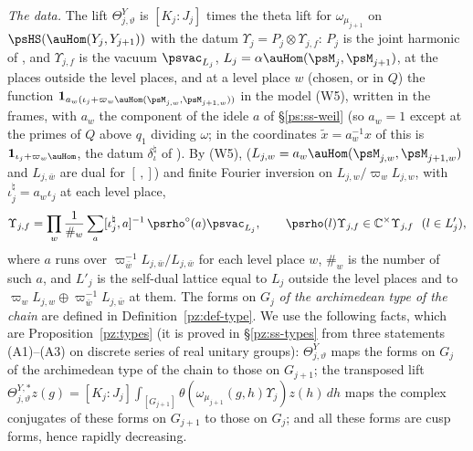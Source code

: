 \documentclass[10pt]{amsart}
\theoremstyle{definition}
\theoremstyle{remark}
\newcommand{\C}{\mathbb C}
\begin{document}
\emph{The data.} The lift $\Theta^Y_{j,\vartheta}$ is $[K_j:J_j]$ times the theta lift for
$\omega_{\mu_{j+1}}$ on $\psHS(\auHom(Y_j,Y_{j+1}))$ with the datum $\Upsilon_j=P_j\otimes
\Upsilon_{j,f}$: $P_j$ is the joint harmonic of {\cite[\S14.3]{P46}}, and $\Upsilon_{j,f}$ is the
vacuum $\psvac_{L_j}$, $L_j=\alpha\auHom(\psM_j,\psM_{j+1})$, at the places outside the level
places, and at a level place $w$ (chosen, or in $Q$) the function
$\mathbf 1_{a_w(\iota_j+\varpi_w\auHom(\psM_{j,w},\psM_{j+1,w}))}$ in the model (W5), written in the
frames, with $a_w$ the component of the idele $a$ of \S\ref{ps:ss-weil} (so $a_w=1$ except at the
primes of $Q$ above $q_1$ dividing $\omega$; in the coordinates $\tilde x=a_w^{-1}x$ of
{\cite[Lemma~6.32]{P53}} this is $\mathbf 1_{\iota_j+\varpi_w\auHom}$, the datum $\delta_\iota^\natural$ of
{\cite[Definition~6.31]{P53}}). By (W5), {\cite[Lemma~6.30]{P53}} ($L_{j,w}=a_w\auHom(\psM_{j,w},\psM_{j+1,w})$ and
$L_{j,\bar w}$ are dual for $[\,,]$) and finite Fourier inversion on $L_{j,w}/\varpi_wL_{j,w}$, with
$\iota^\natural_j=a_w\iota_j$ at each level place,
\begin{equation}\label{ps:eq-upsilon}
\Upsilon_{j,f}=\prod_w\frac1{\#_w}\sum_{a}[\iota^\natural_j,a]^{-1}\,\psrho^\circ(a)\psvac_{L_j},\qquad
\psrho(l)\Upsilon_{j,f}\in\C^\times\Upsilon_{j,f}\ \ (l\in L'_j),
\end{equation}
where $a$ runs over $\varpi_{\bar w}^{-1}L_{j,\bar w}/L_{j,\bar w}$ for each level place $w$,
$\#_w$ is the number of such $a$, and $L'_j$ is the self-dual lattice equal to $L_j$ outside the
level places and to $\varpi_wL_{j,w}\oplus\varpi_{\bar w}^{-1}L_{j,\bar w}$ at them. The forms on
$G_j$ \emph{of the archimedean type of the chain} are defined in Definition~\ref{pz:def-type}. We
use the following facts, which are Proposition~\ref{pz:types} (it is proved in \S\ref{pz:ss-types}
from three statements (A1)--(A3) on discrete series of real unitary groups): $\Theta^Y_{j,\vartheta}$
maps the forms on $G_j$ of the archimedean type of the chain to those on $G_{j+1}$; the
transposed lift $\Theta^{Y,*}_{j,\vartheta}z(g)=[K_j:J_j]\int_{[G_{j+1}]}\theta(\omega_{\mu_{j+1}}
(g,h)\Upsilon_j)z(h)\,dh$ maps the complex conjugates of these forms on $G_{j+1}$ to those on
$G_j$; and all these forms are cusp forms, hence rapidly decreasing.
\end{document}
